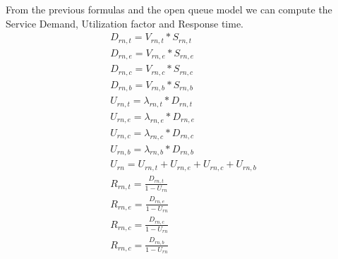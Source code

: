 \documentclass[11pt]{article}
\begin{document}
From the previous formulas and the open queue model we can compute the Service Demand, Utilization factor and Response time.
\begin{equation}
	\begin{array}{l}
		D_{rn, t} = V_{rn, t} * S_{rn, t} \\
		D_{rn, e} = V_{rn, e} * S_{rn, e} \\
		D_{rn, c} = V_{rn, c} * S_{rn, c} \\
		D_{rn, b} = V_{rn, b} * S_{rn, b} \\
		U_{rn, t} = \lambda_{rn, t} * D_{rn, t} \\
		U_{rn, e} = \lambda_{rn, e} * D_{rn, e} \\
		U_{rn, c} = \lambda_{rn, c} * D_{rn, c} \\
		U_{rn, b} = \lambda_{rn, b} * D_{rn, b} \\
        U_{rn} = U_{rn, t} + U_{rn, e} + U_{rn, c} + U_{rn, b} \\
		R_{rn, t} = \frac{D_{rn, t}}{1 - U_{rn}} \\
		R_{rn, e} = \frac{D_{rn, e}}{1 - U_{rn}} \\
		R_{rn, c} = \frac{D_{rn, c}}{1 - U_{rn}} \\
		R_{rn, c} = \frac{D_{rn, b}}{1 - U_{rn}} \\
	\end{array}
\end{equation}
\end{document}
